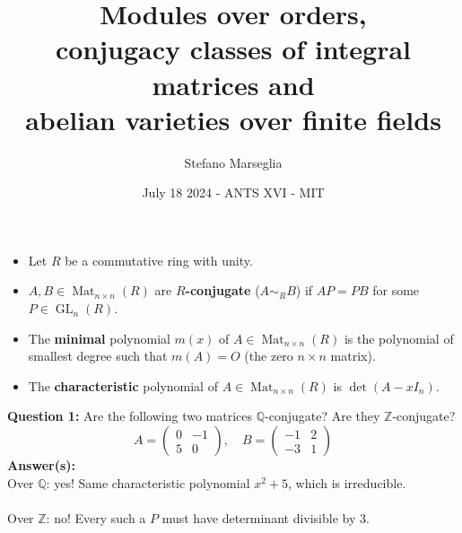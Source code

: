 \documentclass[usenames,dvipsnames]{beamer}
\title[ANTS XVI - MIT]{Modules over orders,\\conjugacy classes of integral matrices and\\ abelian varieties over finite fields}
\subtitle{}
\author[Stefano Marseglia]{Stefano Marseglia}
\institute[UPF]{University of French Polynesia}
\date[July 18 2024]{July 18 2024 - ANTS XVI - MIT}
\def\Q{\mathbb{Q}}
\def\Z{\mathbb{Z}}
\DeclareMathOperator{\Mat}{Mat}
\DeclareMathOperator{\GL}{GL}
\begin{document}
\begin{frame}{}
   \maketitle
\end{frame}


\begin{frame}{}
   \begin{itemize}
      \item Let $R$ be a commutative ring with unity.
      \item $A,B \in \Mat_{n\times n}(R)$ are {\bf $R$-conjugate} ($A\sim_R B$) if $AP=PB$ for some $P\in \GL_n(R)$.
      \item The {\bf minimal} polynomial $m(x)$ of $A \in \Mat_{n\times n}(R)$ is the polynomial of smallest degree such that $m(A) = O$ (the zero $n\times n$ matrix).
      \item The {\bf characteristic} polynomial of $A \in \Mat_{n\times n}(R)$ is $\det(A-xI_n)$.
   \end{itemize}
   {\bf Question 1:} 
   \pause Are the following two matrices $\Q$-conjugate? Are they $\Z$-conjugate?
   \[
   A=\begin{pmatrix}
      0 & -1 \\ 5 & 0
   \end{pmatrix}, \quad
   B=\begin{pmatrix}
      -1 & 2 \\ -3 & 1
   \end{pmatrix}
   \]
   \pause
   {\bf Answer(s):}\\ 
   \pause Over $\Q$: yes! Same characteristic polynomial $x^2+5$, which is irreducible.\\
   \\    
   \pause Over $\Z$: no! Every such a $P$ must have determinant divisible by $3$.
\end{frame}
\end{document}
